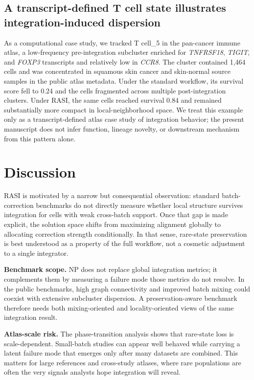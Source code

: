 \documentclass[10pt]{article}
\begin{document}
\subsection*{A transcript-defined T cell state illustrates integration-induced dispersion}

As a computational case study, we tracked T cell\_5 in the pan-cancer immune atlas, a low-frequency pre-integration subcluster enriched for \textit{TNFRSF18}, \textit{TIGIT}, and \textit{FOXP3} transcripts and relatively low in \textit{CCR8}. The cluster contained 1,464 cells and was concentrated in squamous skin cancer and skin-normal source samples in the public atlas metadata. Under the standard workflow, its survival score fell to 0.24 and the cells fragmented across multiple post-integration clusters. Under RASI, the same cells reached survival 0.84 and remained substantially more compact in local-neighborhood space. We treat this example only as a transcript-defined atlas case study of integration behavior; the present manuscript does not infer function, lineage novelty, or downstream mechanism from this pattern alone.

\section*{Discussion}

RASI is motivated by a narrow but consequential observation: standard batch-correction benchmarks do not directly measure whether local structure survives integration for cells with weak cross-batch support. Once that gap is made explicit, the solution space shifts from maximizing alignment globally to allocating correction strength conditionally. In that sense, rare-state preservation is best understood as a property of the full workflow, not a cosmetic adjustment to a single integrator.

\textbf{Benchmark scope.} NP does not replace global integration metrics; it complements them by measuring a failure mode those metrics do not resolve. In the public benchmarks, high graph connectivity and improved batch mixing could coexist with extensive subcluster dispersion. A preservation-aware benchmark therefore needs both mixing-oriented and locality-oriented views of the same integration result.

\textbf{Atlas-scale risk.} The phase-transition analysis shows that rare-state loss is scale-dependent. Small-batch studies can appear well behaved while carrying a latent failure mode that emerges only after many datasets are combined. This matters for large references and cross-study atlases, where rare populations are often the very signals analysts hope integration will reveal.
\end{document}
